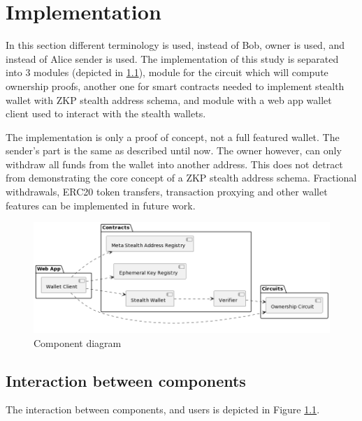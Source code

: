 \chapter{Implementation}\label{chapter:implementation}

In this section different terminology is used, instead of Bob, owner is used,
and instead of Alice sender is used. The implementation of this study is
separated into 3 modules (depicted in \ref{fig:component-diagram}), module for the
circuit which will compute ownership proofs, another one for smart contracts
needed to implement stealth wallet with ZKP stealth address schema, and
module with a web app wallet client used to interact with the stealth wallets.

The implementation is only a proof of concept, not a full featured wallet.
The sender's part is the same as described until now. The owner however,
can only withdraw all funds from the wallet into another address. This does
not detract from demonstrating the core concept of a ZKP stealth address schema.
Fractional withdrawals, ERC20 token transfers, transaction proxying and other wallet
features can be implemented in future work.

\begin{figure}[h!]
    \centering
    \includegraphics[width=\textwidth]{assets/images/component-diagram.png}
    \caption{Component diagram}
    \label{fig:component-diagram}
    \vspace{0.5cm}
\end{figure}

\section{Interaction between components}

The interaction between components, and users is depicted in Figure \ref{fig:component-diagram}.

